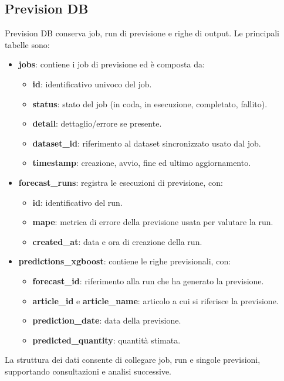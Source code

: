 \subsection{Prevision DB}
Prevision DB conserva job, run di previsione e righe di output. Le principali tabelle sono:
\begin{itemize}
    \item \textbf{jobs}: contiene i job di previsione ed è composta da:
    \begin{itemize}
        \item \textbf{id}: identificativo univoco del job.
        \item \textbf{status}: stato del job (in coda, in esecuzione, completato, fallito).
        \item \textbf{detail}: dettaglio/errore se presente.
        \item \textbf{dataset\_id}: riferimento al dataset sincronizzato usato dal job.
        \item \textbf{timestamp}: creazione, avvio, fine ed ultimo aggiornamento.
    \end{itemize}
    \item \textbf{forecast\_runs}: registra le esecuzioni di previsione, con:
    \begin{itemize}
        \item \textbf{id}: identificativo del run.
        \item \textbf{mape}: metrica di errore della previsione usata per valutare la run.
        \item \textbf{created\_at}: data e ora di creazione della run.
    \end{itemize}
    \item \textbf{predictions\_xgboost}: contiene le righe previsionali, con:
    \begin{itemize}
        \item \textbf{forecast\_id}: riferimento alla run che ha generato la previsione.
        \item \textbf{article\_id} e \textbf{article\_name}: articolo a cui si riferisce la previsione.
        \item \textbf{prediction\_date}: data della previsione.
        \item \textbf{predicted\_quantity}: quantità stimata.
    \end{itemize}
\end{itemize}
La struttura dei dati consente di collegare job, run e singole previsioni, supportando consultazioni e analisi successive.

